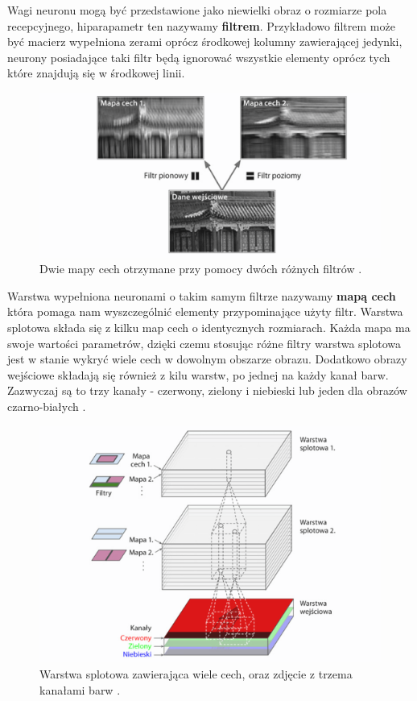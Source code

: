 \documentclass{article}
\begin{document}
\begin{itemize}
Wagi neuronu mogą być przedstawione jako niewielki obraz o rozmiarze pola recepcyjnego, 
hiparapametr ten nazywamy \textbf{filtrem}.
Przykładowo filtrem może być macierz wypełniona zerami oprócz środkowej
kolumny zawierającej jedynki, neurony posiadające taki filtr będą ignorować wszystkie elementy
oprócz tych które znajdują się w środkowej linii.

\begin{figure}[H]
\centering
\includegraphics[scale=0.6]{filtr.png}
\caption{Dwie mapy cech otrzymane przy pomocy dwóch różnych filtrów \cite{um}.}
\end{figure}

Warstwa wypełniona neuronami o takim
samym filtrze nazywamy \textbf{mapą cech} która pomaga nam wyszczególnić elementy przypominające
użyty filtr. Warstwa splotowa składa się z kilku map cech o identycznych rozmiarach.
Każda mapa ma swoje wartości parametrów, dzięki czemu stosując różne filtry 
warstwa splotowa jest w stanie wykryć wiele cech w dowolnym obszarze obrazu.
Dodatkowo obrazy wejściowe składają się również z kilu warstw, po jednej na każdy kanał
barw. Zazwyczaj są to trzy kanały - czerwony, zielony i niebieski lub jeden dla obrazów
czarno-białych \cite{um}.


\begin{figure}[H]
\centering
\includegraphics[scale=0.6]{rgb_cnn.png}
\caption{Warstwa splotowa zawierająca wiele cech, oraz zdjęcie z trzema kanałami barw \cite{um}.}
\end{figure}


\end{itemize}
\end{document}
